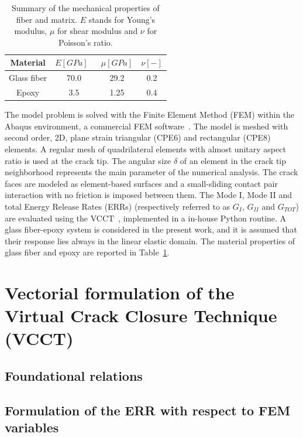 \documentclass[review]{elsarticle}
\begin{document}
\begin{table}[!htbp]
 \centering
 \caption{Summary of the mechanical properties of fiber and matrix. $E$ stands for Young's modulus, $\mu$ for shear modulus and $\nu$ for Poisson's ratio.}
 \begin{tabular}{cccc}
\textbf{Material} & \textbf{$E\left[GPa\right]$}\ & \textbf{$\mu\left[GPa\right]$} & \textbf{$\nu\left[-\right]$} \\
\midrule
Glass fiber    & 70.0  & 29.2   & 0.2  \\
Epoxy    & 3.5    & 1.25   & 0.4
\end{tabular}
\label{tab:phaseprop}
\end{table}

The model problem is solved with the Finite Element Method (FEM) within the Abaqus environment, a commercial FEM software~\cite{abq12}. The model is meshed with second order, 2D, plane strain triangular (CPE6) and rectangular (CPE8) elements. A regular mesh of quadrilateral elements with almost unitary aspect ratio is used at the crack tip. The angular size $\delta$ of an element in the crack tip neighborhood represents the main parameter of the numerical analysis. The crack faces are modeled as element-based surfaces and a small-sliding contact pair interaction with no friction is imposed between them. The Mode I, Mode II and total Energy Release Rates (ERRs) (respectively referred to as $G_{I}$, $G_{II}$ and $G_{TOT}$) are evaluated using the VCCT~\cite{Krueger2004}, implemented in a in-house Python routine. A glass fiber-epoxy system is considered in the present work, and it is assumed that their response lies always in the linear elastic domain. The material properties of glass fiber and epoxy are reported in Table~\ref{tab:phaseprop}.

\section{Vectorial formulation of the Virtual Crack Closure Technique (VCCT)}

\subsection{Foundational relations}

\subsection{Formulation of the ERR with respect to FEM variables}
\end{document}
